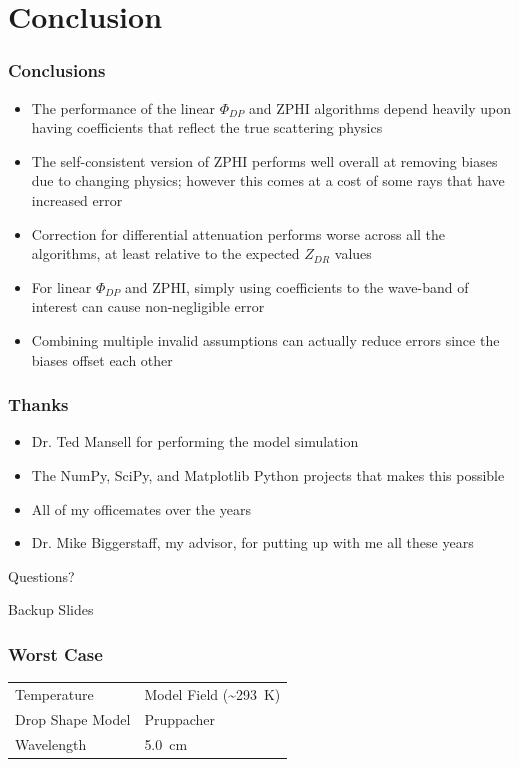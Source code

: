 \documentclass[red]{beamer}
\begin{document}
\section{Conclusion}
\begin{frame}[<+->]
	\frametitle{Conclusions}
	\begin{itemize}
		\item The performance of the linear $\Phi_{DP}$ and ZPHI algorithms depend heavily upon having coefficients
		that reflect the true scattering physics
		\item The self-consistent version of ZPHI performs well overall at removing biases due to changing physics; however this comes
		at a cost of some rays that have increased error
		\item Correction for differential attenuation performs worse across all the algorithms, at least relative to the expected $Z_{DR}$ values
		\item For linear $\Phi_{DP}$ and ZPHI, simply using coefficients to the wave-band of interest can cause non-negligible error
		\item Combining multiple invalid assumptions can actually reduce errors since the biases offset each other
	\end{itemize}
\end{frame}

\begin{frame}
	\frametitle{Thanks}
	\begin{itemize}
		\item Dr. Ted Mansell for performing the model simulation
		\item The NumPy, SciPy, and Matplotlib Python projects that makes this possible
		\item All of my officemates over the years
		\item Dr. Mike Biggerstaff, my advisor, for putting up with me all these years
	\end{itemize}
	\begin{center}
		\large{Questions?}
	\end{center}
\end{frame}

\begin{frame}
	Backup Slides
\end{frame}

\begin{frame}
	\frametitle{Worst Case}
	\begin{center}
	    \begin{tabular}{ | l | l | }
	        \hline
	        Temperature & Model Field (\textasciitilde\SI{293}{\kelvin}) \\
	        Drop Shape Model & Pruppacher \\
	        Wavelength & \SI{5.0}{\centi\meter} \\
			\hline
	    \end{tabular}
	\end{center}	
\end{frame}
\end{document}
